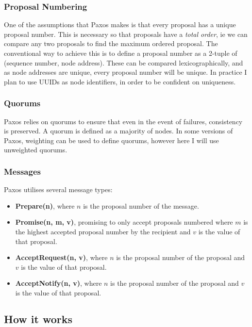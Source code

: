 \documentclass[12pt,twoside,notitlepage]{report}
\newcommand{\msg}[1] {{\bf #1}}         %
\begin{document}
\subsubsection*{Proposal Numbering}

One of the assumptions that Paxos makes is that every proposal has a unique proposal number. This
is necessary so that proposals have a \emph{total order}, ie we can compare any two proposals to
find the maximum ordered proposal. The conventional way to achieve this is to define a proposal
number as a 2-tuple of (sequence number, node address). These can be compared lexicographically,
and as node addresses are unique, every proposal number will be unique. In practice I plan to use
UUIDs as node identifiers, in order to be confident on uniqueness.

\subsubsection*{Quorums}

Paxos relies on quorums to ensure that even in the event of failures, consistency is preserved. A
quorum is defined as a majority of nodes. In some versions of Paxos, weighting can be used to
define quorums, however here I will use unweighted quorums.

\subsubsection*{Messages}

Paxos utilises several message types:

\begin{itemize}
\item \msg{Prepare(n)}, where $n$ is the proposal number of the message.
\item \msg{Promise(n, m, v)}, promising to only accept proposals numbered where $m$ is the highest accepted proposal number by the recipient and
	$v$ is the value of that proposal.
\item \msg{AcceptRequest(n, v)}, where $n$ is the proposal number of the proposal and $v$ is the
	value of that proposal.
\item \msg{AcceptNotify(n, v)}, where $n$ is the proposal number of the proposal and $v$ is the value
	of that proposal.
\end{itemize}

\subsection{How it works}
\end{document}
